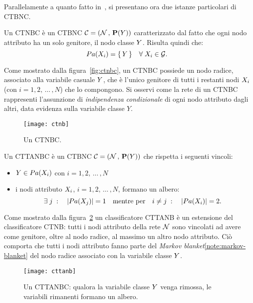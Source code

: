 Parallelamente a quanto fatto in~\citet{Langley1992}, si presentano ora due istanze particolari di \acl{CTBNC}.

\begin{definizione}\label{defn:ctnbc}
Un \acf{CTNBC} è un \acl{CTBNC} $\mathcal{C}=(\mathcal{N}\,,\,\mathbf{P}(\mathnormal{Y}))$ caratterizzato dal fatto che ogni nodo attributo ha un solo genitore, il nodo classe $\mathnormal{Y}$. Risulta quindi che:
\[
Pa(\mathnormal{X}_i)=\{\,\mathnormal{Y}\,\} \quad \forall \; \mathnormal{X}_i \in \mathcal{G}\text{.}
\]
\end{definizione}
Come mostrato dalla figura~\vref{fig:ctnbc}, un \acs{CTNBC} possiede un nodo radice, associato alla variabile casuale $\mathnormal{Y}$, che è l'unico genitore di tutti i restanti nodi $\mathnormal{X}_i$ (con $i=1,2,\,\dotsc\,,N$) che lo compongono. Si osservi come la rete di un \acs{CTNBC} rappresenti l'assunzione di \emph{indipendenza condizionale} di ogni nodo attributo dagli altri, data evidenza sulla variabile classe $Y$.

\begin{figure}[b]
\centering
\texttt{[image: ctnb]}
\caption[Un \acs{CTNBC}]{Un \acf{CTNBC}.}
\label{fig:ctnbc}
\end{figure}

\begin{definizione}\label{defn:cttanbc}
Un \acf{CTTANBC} è un \acl{CTBNC} $\mathcal{C}=(\mathcal{N}\,,\,\mathbf{P}(\mathnormal{Y}))$ che rispetta i seguenti vincoli:
\begin{itemize}
    \item $\mathnormal{Y} \in Pa(\mathnormal{X}_i)$ con $i=1,2,\,\dotsc\,,N$
    \item i nodi attributo $\mathnormal{X}_i$, $i=1,2,\,\dotsc\,,N$, formano un albero:
    \[
    \exists \; j \; : \quad |Pa(\mathnormal{X}_j)|=1 \quad \text{mentre per} \quad i \neq j \; : \quad |Pa(\mathnormal{X}_i)|=2\text{.}
    \]
\end{itemize}
\end{definizione}
Come mostrato dalla figura~\ref{fig:cttanbc} un classificatore \acs{CTTANB} è un estensione del classificatore \acs{CTNB}: tutti i nodi attributo della rete $\mathcal{N}$ sono vincolati ad avere come genitore, oltre al nodo radice, al massimo un altro nodo attributo. Ciò comporta che tutti i nodi attributo fanno parte del \emph{Markov blanket}\cref{note:markov-blanket} del nodo radice associato con la variabile classe $\mathnormal{Y}$.

\begin{figure}
\centering
\texttt{[image: cttanb]}
\caption[Un \acs{CTTANBC}]{Un \acf{CTTANBC}: qualora la variabile classe $\mathnormal{Y}$ venga rimossa, le variabili rimanenti formano un albero.}
\label{fig:cttanbc}
\end{figure}

